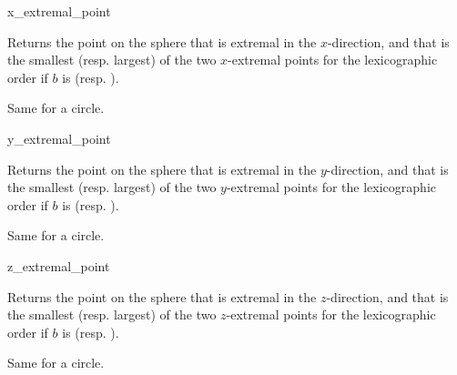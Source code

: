 \begin{ccRefFunction}{x_extremal_point}


{Returns the point on the sphere that is extremal in the
  $x$-direction, and that is the smallest (resp. largest) of the two
  $x$-extremal points for the lexicographic order if $b$ is  
  (resp. ).}

{Same for a circle.}

\end{ccRefFunction}
\begin{ccRefFunction}{y_extremal_point}


{Returns the point on the sphere that is extremal in the
  $y$-direction, and that is the smallest (resp. largest) of the two
  $y$-extremal points for the lexicographic order if $b$ is  
  (resp. ).}

{Same for a circle.}

\end{ccRefFunction}
\begin{ccRefFunction}{z_extremal_point}


{Returns the point on the sphere that is extremal in the
  $z$-direction, and that is the smallest (resp. largest) of the two
  $z$-extremal points for the lexicographic order if $b$ is  
  (resp. ).}

{Same for a circle.}

\end{ccRefFunction}
